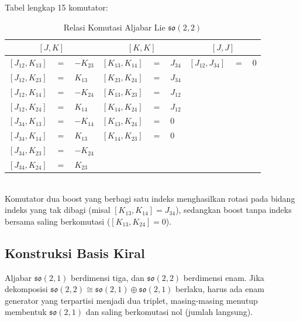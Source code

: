 Tabel lengkap 15 komutator:
\begin{table}[htbp]
\centering
\caption{Relasi Komutasi Aljabar Lie $\mathfrak{so}(2,2)$}
\label{tab:komutator}
\renewcommand{\arraystretch}{1.25}
\begin{tabular}{@{}rcl@{\qquad}rcl@{\qquad}rcl@{}}
\toprule
\multicolumn{3}{c}{\textbf{$[J,K]$}} &
\multicolumn{3}{c}{\textbf{$[K,K]$}} &
\multicolumn{3}{c}{\textbf{$[J,J]$}} \\
\midrule
$[J_{12}, K_{13}]$ & $=$ & $-K_{23}$ &
$[K_{13}, K_{14}]$ & $=$ & $J_{34}$  &
$[J_{12}, J_{34}]$ & $=$ & $0$ \\

$[J_{12}, K_{23}]$ & $=$ & $K_{13}$  &
$[K_{23}, K_{24}]$ & $=$ & $J_{34}$  & & & \\

$[J_{12}, K_{14}]$ & $=$ & $-K_{24}$ &
$[K_{13}, K_{23}]$ & $=$ & $J_{12}$  & & & \\

$[J_{12}, K_{24}]$ & $=$ & $K_{14}$  &
$[K_{14}, K_{24}]$ & $=$ & $J_{12}$  & & & \\
\addlinespace
$[J_{34}, K_{13}]$ & $=$ & $-K_{14}$ &
$[K_{13}, K_{24}]$ & $=$ & $0$       & & & \\

$[J_{34}, K_{14}]$ & $=$ & $K_{13}$  &
$[K_{14}, K_{23}]$ & $=$ & $0$       & & & \\

$[J_{34}, K_{23}]$ & $=$ & $-K_{24}$ & & & & & & \\

$[J_{34}, K_{24}]$ & $=$ & $K_{23}$  & & & & & & \\
\bottomrule
\end{tabular}
\end{table}\\
Komutator dua boost yang berbagi satu indeks menghasilkan rotasi pada bidang indeks yang tak dibagi (misal $[K_{13},K_{14}] = J_{34}$), sedangkan boost tanpa indeks bersama saling berkomutasi ($[K_{13},K_{24}] = 0$).

\subsection{Konstruksi Basis Kiral}

Aljabar $\mathfrak{so}(2,1)$ berdimensi tiga, dan $\mathfrak{so}(2,2)$ berdimensi enam. Jika dekomposisi $\mathfrak{so}(2,2) \cong \mathfrak{so}(2,1) \oplus \mathfrak{so}(2,1)$ berlaku, harus ada enam generator yang terpartisi menjadi dua triplet, masing-masing menutup membentuk $\mathfrak{so}(2,1)$ dan saling berkomutasi nol (jumlah langsung).

